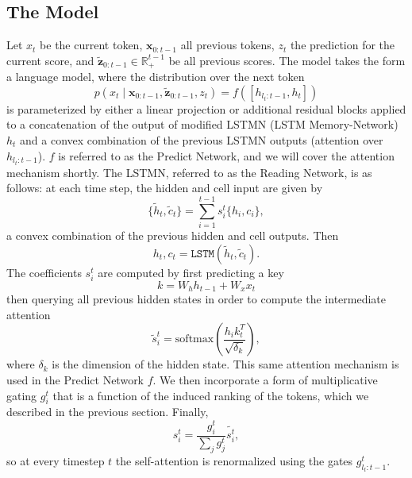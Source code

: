 \documentclass{article}
\newcommand{\bx}{\mathbf{x}}
\newcommand{\bz}{\mathbf{z}}
\newcommand{\R}{\mathbb{R}}
\begin{document}
\subsection{The Model}
Let $x_t$ be the current token, $\bx_{0:t-1}$ all previous tokens, $z_t$ the prediction for the current score,
and $\tilde{\bz}_{0:t-1}\in\R^{t-1}_+$ be all previous scores.
The model takes the form a language model, where
the distribution over the next token
$$p(x_t\mid \bx_{0:t-1}, \tilde{\bz}_{0:t-1},z_t) = f([h_{l_t:t-1},h_t])$$
is parameterized by either a linear projection or additional residual blocks
applied to a concatenation of the output of modified LSTMN (LSTM Memory-Network) $h_t$
and a convex combination of the previous LSTMN outputs (attention over $h_{l_t:t-1}$).
$f$ is referred to as the Predict Network, and we will cover the attention mechanism shortly.
The LSTMN, referred to as the Reading Network, is as follows:
at each time step, the hidden and cell input are given by
$$\{\tilde{h}_t,\tilde{c}_t\} = \sum_{i=1}^{t-1} s_i^t\{h_i,c_i\},$$
a convex combination of the previous hidden and cell outputs.
Then $$h_t,c_t = \texttt{LSTM}(\tilde{h}_t,\tilde{c}_t).$$
The coefficients $s_i^t$ are computed by first predicting a key $$k = W_hh_{t-1}+W_xx_t$$
then querying all previous hidden states in order to compute the intermediate attention
$$\tilde{s}_i^t = \textrm{softmax}(\frac{h_ik_t^T}{\sqrt{\delta_k}}),$$
where $\delta_k$ is the dimension of the hidden state.
This same attention mechanism is used in the Predict Network $f$.
We then incorporate a form of multiplicative gating $g_i^t$
that is a function of the induced ranking of the tokens,
which we described in the previous section.
Finally,
$$s_i^t = \frac{g_i^t}{\sum_jg_j^t}\tilde{s_i^t},$$
so at every timestep $t$ the self-attention is renormalized using the gates $g_{l_t:t-1}^t$.
\end{document}
